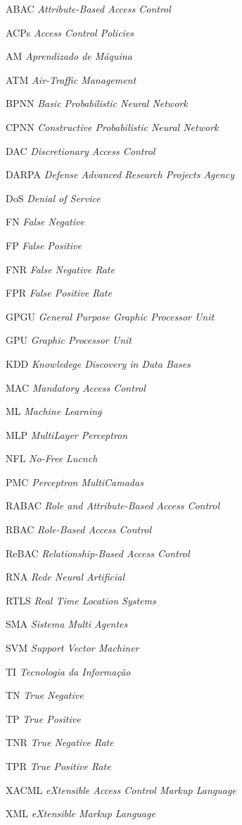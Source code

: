 \documentclass[
	12pt,				%
	openright,			%
	oneside,			%
	a4paper,			%
	english,			%
	french,				%
	spanish,			%
	brazil				%
	]{abntex2}
\begin{document}
\begin{siglas}
  \item [ABAC] \textit{Attribute-Based Access Control}  
  \item [ACPs] \textit{Access Control Policies}
  \item[AM] \textit{Aprendizado de Máquina}
  \item[ATM] \textit{Air-Traffic Management}
  \item[BPNN] \textit{Basic Probabilistic Neural Network}
  \item[CPNN] \textit{Constructive Probabilistic Neural Network}
  \item[DAC] \textit{Discretionary Access Control}
  \item[DARPA] \textit{Defense Advanced Research Projects Agency}
  \item[DoS] \textit{Denial of Service}
  \item[FN] \textit{False Negative}
  \item[FP] \textit{False Positive}
  \item[FNR] \textit{False Negative Rate}
  \item[FPR] \textit{False Positive Rate}
  \item[GPGU] \textit{General Purpose Graphic Processor Unit}
  \item[GPU] \textit{Graphic Processor Unit}
  \item[KDD] \textit{Knowledege Discovery in Data Bases}
  \item[MAC] \textit{Mandatory Access Control}
  \item[ML] \textit{Machine Learning}
  \item[MLP] \textit{MultiLayer Perceptron}
  \item[NFL] \textit{No-Free Lucnch}
  \item[PMC] \textit{Perceptron MultiCamadas}
  \item [RABAC] \textit{Role and Attribute-Based Access Control}
  \item[RBAC] \textit{Role-Based Access Control}
  \item[ReBAC] \textit{Relationship-Based Access Control}
  \item[RNA] \textit{Rede Neural Artificial}
  \item[RTLS] \textit{Real Time Location Systems}
  \item[SMA] \textit{Sistema Multi Agentes}
  \item[SVM] \textit{Support Vector Machiner}
  \item[TI] \textit{Tecnologia da Informação}
  \item[TN] \textit{True Negative}
  \item[TP] \textit{True Positive}
  \item[TNR] \textit{True Negative Rate}
  \item[TPR] \textit{True Positive Rate}
  \item[XACML] \textit{eXtensible Access Control Markup Language}
  \item[XML] \textit{eXtensible Markup Language} 
\end{siglas}
\end{document}
